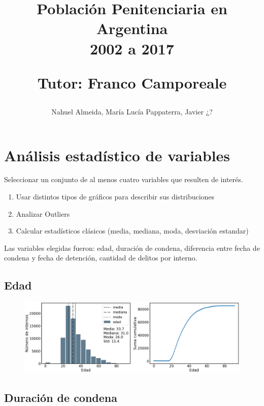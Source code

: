 \documentclass[10pt]{article}
\begin{document}
	
\title{Población Penitenciaria en Argentina\\ 2002 a 2017 \\
	\begin{small}
		Tutor: Franco Camporeale
	\end{small}}
\author{\small{Nahuel Almeida, María Lucía Pappaterra, Javier ¿?}}

\maketitle

\section{Análisis estadístico de variables}

Seleccionar un conjunto de al menos cuatro variables que resulten de interés.

\begin{enumerate}
	\item Usar distintos tipos de gráficos para describir sus distribuciones
	\item Analizar Outliers
	\item Calcular estadísticos clásicos (media, mediana, moda, desviación estandar)
\end{enumerate}

Las variables elegidas fueron: edad, duración de condena, diferencia entre fecha de condena y fecha de detención, cantidad de delitos por interno.

\subsection{Edad}

\begin{figure}[H]
	\centering
	\includegraphics[scale=0.28]{graficos/edad.png}
	\caption{}
\end{figure}

\subsection{Duración de condena}
\end{document}
